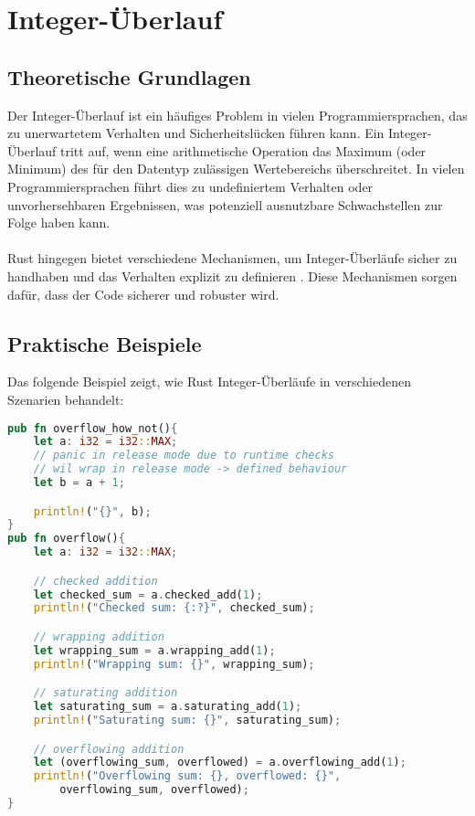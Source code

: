 \chapter{Integer-Überlauf}

\section{Theoretische Grundlagen}

Der Integer-Überlauf ist ein häufiges Problem in vielen Programmiersprachen, das zu unerwartetem Verhalten und Sicherheitslücken führen kann. 
Ein Integer-Überlauf tritt auf, wenn eine arithmetische Operation das Maximum (oder Minimum) des für den Datentyp zulässigen Wertebereichs überschreitet. 
In vielen Programmiersprachen führt dies zu undefiniertem Verhalten oder unvorhersehbaren Ergebnissen, was potenziell ausnutzbare Schwachstellen zur Folge haben kann.\\
\\
Rust hingegen bietet verschiedene Mechanismen, um Integer-Überläufe sicher zu handhaben und das Verhalten explizit zu definieren \cite{rust2023}. 
Diese Mechanismen sorgen dafür, dass der Code sicherer und robuster wird.

\section{Praktische Beispiele}

Das folgende Beispiel zeigt, wie Rust Integer-Überläufe in verschiedenen Szenarien behandelt:

\begin{lstlisting}[language=Rust, caption=Beispielcode zur Behandlung von Integer-Überläufen in Rust, label=list:overflow_example]
pub fn overflow_how_not(){
    let a: i32 = i32::MAX;
    // panic in release mode due to runtime checks
    // wil wrap in release mode -> defined behaviour
    let b = a + 1;  

    println!("{}", b);
}
pub fn overflow(){
    let a: i32 = i32::MAX;

    // checked addition 
    let checked_sum = a.checked_add(1);
    println!("Checked sum: {:?}", checked_sum);  

    // wrapping addition 
    let wrapping_sum = a.wrapping_add(1);
    println!("Wrapping sum: {}", wrapping_sum);  

    // saturating addition 
    let saturating_sum = a.saturating_add(1);
    println!("Saturating sum: {}", saturating_sum);  

    // overflowing addition 
    let (overflowing_sum, overflowed) = a.overflowing_add(1);
    println!("Overflowing sum: {}, overflowed: {}",
        overflowing_sum, overflowed);  
}
\end{lstlisting}


